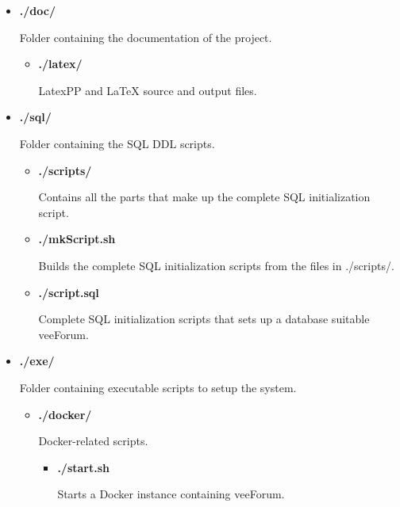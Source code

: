 \documentclass[12pt]{report}
\renewcommand\emph{\textbf}
\begin{document}
            \begin{itemize}
                \item \emph{./doc/}
                    
                    Folder containing the documentation of the project.
                    \begin{itemize}
                        \item \emph{./latex/} 

                        LatexPP and \LaTeX{}  source and output files.                            
                    \end{itemize}
            
                \item \emph{./sql/}

                    Folder containing the SQL DDL scripts.
                    \begin{itemize}
                        \item \emph{./scripts/}

                        Contains all the parts that make up the complete SQL initialization script.
                        
                        \item \emph{./mkScript.sh}

                        Builds the complete SQL initialization scripts from the files in ./scripts/.

                        \item \emph{./script.sql}

                        Complete SQL initialization scripts that sets up a database suitable veeForum.
                    \end{itemize}

                \item \emph{./exe/}
                    
                    Folder containing executable scripts to setup the system.
                    \begin{itemize}
                        \item \emph{./docker/} 

                        Docker-related scripts.
                        \begin{itemize}
                            \item \emph{./start.sh} 

                            Starts a Docker instance containing veeForum.


\end{itemize}
\end{itemize}
\end{itemize}
\end{document}
